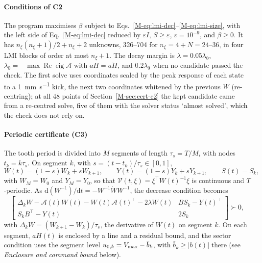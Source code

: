 \paragraph{Conditions of C2}
The program maximises $\beta$ subject to Eqs.~\eqref{M-eq:lmi-dec}--\eqref{M-eq:lmi-size}, with the left side of Eq.~\eqref{M-eq:lmi-dec} reduced by $\varepsilon I$, $S\ge\varepsilon$, $\varepsilon=10^{-9}$, and $\beta\ge0$. It has $n_\xi(n_\xi+1)/2+n_\xi+2$ unknowns, 326--704 for $n_\xi=4+N=24$--36, in four LMI blocks of order at most $n_\xi+1$. The decay margin is $\lambda=0.05\lambda_0$, $\lambda_0=-\max\operatorname{Re}\operatorname{eig}\mathcal A$ with $aH=\overline{aH}$, and $0.2\lambda_0$ when no candidate passed the check. The first solve uses coordinates scaled by the peak response of each state to a \SI{1}{\milli\metre\per\second} kick, the next two coordinates whitened by the previous $W$ (re-centring); at all 48 points of Section~\ref{M-sec:cert-c2} the kept candidate came from a re-centred solve, five of them with the solver status `almost solved', which the check does not rely on.

\paragraph{Periodic certificate (C3)}
The tooth period is divided into $M$ segments of length $\tau_s=T/M$, with nodes $t_k=k\tau_s$. On segment $k$, with $s=(t-t_k)/\tau_s\in[0,1]$,
\begin{equation}\label{eq:Wt}
W(t)=(1-s)W_k+sW_{k+1},\qquad Y(t)=(1-s)Y_k+sY_{k+1},\qquad S(t)=S_k,
\end{equation}
with $W_M=W_0$ and $Y_M=Y_0$, so that $\mathcal V(t,\xi)=\xi^\top W(t)^{-1}\xi$ is continuous and $T$-periodic. As $\mathrm d(W^{-1})/\mathrm dt=-W^{-1}\dot WW^{-1}$, the decrease condition becomes
\begin{equation}\label{eq:lmi-per}
\begin{bmatrix}\Delta_kW-\mathcal A(t)W(t)-W(t)\mathcal A(t)^\top-2\lambda W(t) & BS_k-Y(t)^\top\\ S_kB^\top-Y(t) & 2S_k\end{bmatrix}\succ0,
\end{equation}
with $\Delta_kW=(W_{k+1}-W_k)/\tau_s$, the derivative of $W(t)$ on segment $k$. On each segment, $aH(t)$ is enclosed by a line and a residual bound, and the sector condition uses the segment level $u_{0,k}=V_{\max}-\bar b_k$, with $\bar b_k\ge\lvert b(t)\rvert$ there (see \emph{Enclosure and command bound} below).


